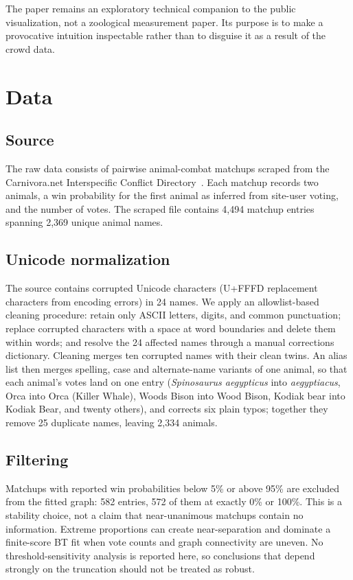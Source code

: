 \documentclass[11pt]{article}
\begin{document}
The paper remains an exploratory technical companion to the public visualization, not a zoological measurement paper. Its purpose is to make a provocative intuition inspectable rather than to disguise it as a result of the crowd data.


\section{Data}
\label{sec:data}

\subsection{Source}
The raw data consists of pairwise animal-combat matchups scraped from the Carnivora.net Interspecific Conflict Directory~\cite{carnivora}. Each matchup records two animals, a win probability for the first animal as inferred from site-user voting, and the number of votes. The scraped file contains 4,494 matchup entries spanning 2,369 unique animal names.

\subsection{Unicode normalization}
The source contains corrupted Unicode characters (U+FFFD replacement characters from encoding errors) in 24 names. We apply an allowlist-based cleaning procedure: retain only ASCII letters, digits, and common punctuation; replace corrupted characters with a space at word boundaries and delete them within words; and resolve the 24 affected names through a manual corrections dictionary. Cleaning merges ten corrupted names with their clean twins. An alias list then merges spelling, case and alternate-name variants of one animal, so that each animal's votes land on one entry (\textit{Spinosaurus aegypticus} into \textit{aegyptiacus}, Orca into Orca (Killer Whale), Woods Bison into Wood Bison, Kodiak bear into Kodiak Bear, and twenty others), and corrects six plain typos; together they remove 25 duplicate names, leaving 2,334 animals.

\subsection{Filtering}
Matchups with reported win probabilities below 5\% or above 95\% are excluded from the fitted graph: 582 entries, 572 of them at exactly 0\% or 100\%. This is a stability choice, not a claim that near-unanimous matchups contain no information. Extreme proportions can create near-separation and dominate a finite-score BT fit when vote counts and graph connectivity are uneven. No threshold-sensitivity analysis is reported here, so conclusions that depend strongly on the truncation should not be treated as robust.
\end{document}
